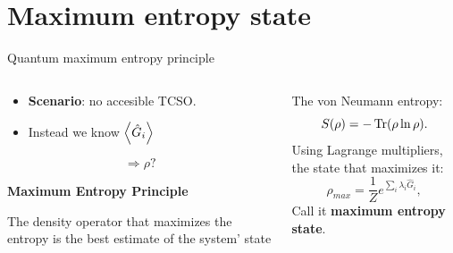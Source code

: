 \section{Maximum entropy state}

\begin{frame}{Quantum maximum entropy principle}
    \begin{columns}
        \begin{column}{0.5\textwidth}
            \begin{itemize}
                \item \textbf{Scenario}: no accesible TCSO.
                \item Instead we know $\expval{\hat{G}_{i}}$
            \end{itemize}
            \begin{equation*}
                \Longrightarrow \rho\text{?}
            \end{equation*}
            \vspace{0.1cm}

            \textbf{Maximum Entropy Principle}
            \begin{tcolorbox}
                The density operator that maximizes the entropy is the best estimate of the system' state
            \end{tcolorbox}
            \vspace{0.5cm}
        \end{column}
        \begin{column}{0.5\textwidth}
            The von Neumann entropy:
            \begin{equation*}
                S(\rho)=-\Tr(\rho\ln{\rho}).
            \end{equation*}
            Using Lagrange multipliers, the state that maximizes it:
            \begin{equation*}
                \rho_{max}=\frac{1}{Z}e^{\sum_{i}\lambda_{i}\hat{G}_{i}},
            \end{equation*}
            Call it \textbf{maximum entropy state}.
        \end{column}
    \end{columns}
\end{frame}

